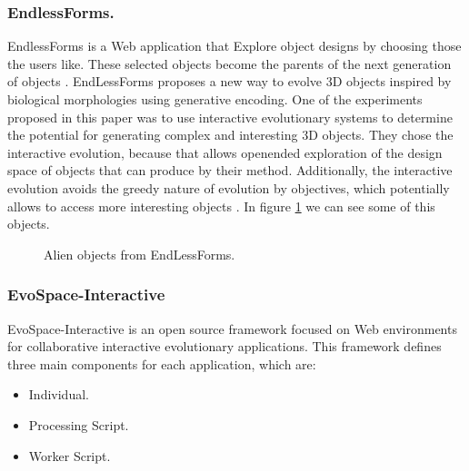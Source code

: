 \subsubsection{EndlessForms.}
EndlessForms is a Web application that Explore object designs by choosing those
the users like. These selected objects become the parents of the next generation
of objects \cite{clune2011evolving}. EndLessForms proposes a new way to evolve
3D objects inspired by biological morphologies using generative encoding. One of
the experiments proposed in this paper was to use interactive evolutionary
systems to determine the potential for generating complex and interesting 3D
objects. They chose the interactive evolution, because that allows openended
exploration of the design space of objects that can produce by their method.
Additionally, the interactive evolution avoids the greedy nature of evolution by
objectives, which potentially allows to access more interesting objects
\cite{clune2011evolving}. In figure \ref{fig:EndlessForms} we can see some of
this objects.

\begin{figure}
\captionsetup{justification=centering,margin=2cm}
\centering
\setlength\fboxsep{0pt}
\setlength\fboxrule{0.7pt}
\caption{Alien objects from EndLessForms.}
\label{fig:EndlessForms}
\end{figure}

\subsubsection{EvoSpace-Interactive} EvoSpace-Interactive is an open source
framework focused on Web environments for collaborative interactive evolutionary
applications. This framework defines three main components for each application,
which are:
\begin{itemize}
	\item Individual.
	\item Processing Script.
	\item Worker Script.
\end{itemize}

